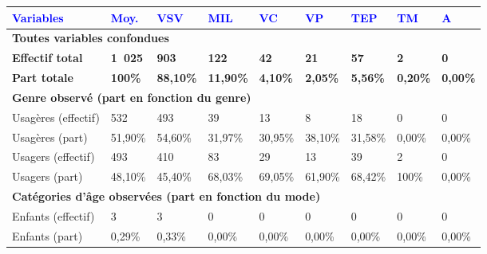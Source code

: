         \begin{longtable}{p{3.7cm}p{0.9cm}p{0.9cm}p{0.9cm}p{0.9cm}p{0.9cm}p{0.9cm}p{0.9cm}p{0.9cm}}
         \textcolor{blue}{\textbf{Variables}} & \textcolor{blue}{\textbf{Moy.}} & \textcolor{blue}{\textbf{VSV}} & \textcolor{blue}{\textbf{MIL}} & \textcolor{blue}{\textbf{VC}} & \textcolor{blue}{\textbf{VP}} & \textcolor{blue}{\textbf{TEP}} & \textcolor{blue}{\textbf{TM}} & \textcolor{blue}{\textbf{A}}\\
        \hline
        \endhead     
\multicolumn{9}{l}{\textbf{Toutes variables confondues}}\\
    \small{\textbf{Effectif total}} & \small{\textbf{1~025}} & \small{\textbf{903}} & \small{\textbf{122}} & \small{\textbf{42}} & \small{\textbf{21}} & \small{\textbf{57}} & \small{\textbf{2}} & \small{\textbf{0}}\\   
    \small{\textbf{Part totale}} & \small{\textbf{100\%}} & \small{\textbf{88,10\%}} & \small{\textbf{11,90\%}} & \small{\textbf{4,10\%}} & \small{\textbf{2,05\%}} & \small{\textbf{5,56\%}} & \small{\textbf{0,20\%}} & \small{\textbf{0,00\%}}\\
    \hline    
\multicolumn{9}{l}{\textbf{Genre observé (part en fonction du genre)}}\\
    \small{Usagères (effectif)} & \small{532} & \small{493} & \small{39} & \small{13} & \small{8} & \small{18} & \small{0} & \small{0}\\  
    \small{Usagères (part)} & \small{51,90\%} & \small{54,60\%} & \small{31,97\%} & \small{30,95\%} & \small{38,10\%} & \small{31,58\%} & \small{0,00\%} & \small{0,00\%}\\    
    \small{Usagers (effectif)} & \small{493} & \small{410} & \small{83} & \small{29} & \small{13} & \small{39} & \small{2} & \small{0}\\    
    \small{Usagers (part)} & \small{48,10\%} & \small{45,40\%} & \small{68,03\%} & \small{69,05\%} & \small{61,90\%} & \small{68,42\%} & \small{100\%} & \small{0,00\%}\\
    \hline   
\multicolumn{9}{l}{\textbf{Catégories d'âge observées (part en fonction du mode)}}\\
    \small{Enfants (effectif)} & \small{3} & \small{3} & \small{0} & \small{0} & \small{0} & \small{0} & \small{0} & \small{0}\\   
    \small{Enfants (part)} & \small{0,29\%} & \small{0,33\%} & \small{0,00\%} & \small{0,00\%} & \small{0,00\%} & \small{0,00\%} & \small{0,00\%} & \small{0,00\%}\\    

\end{longtable}
